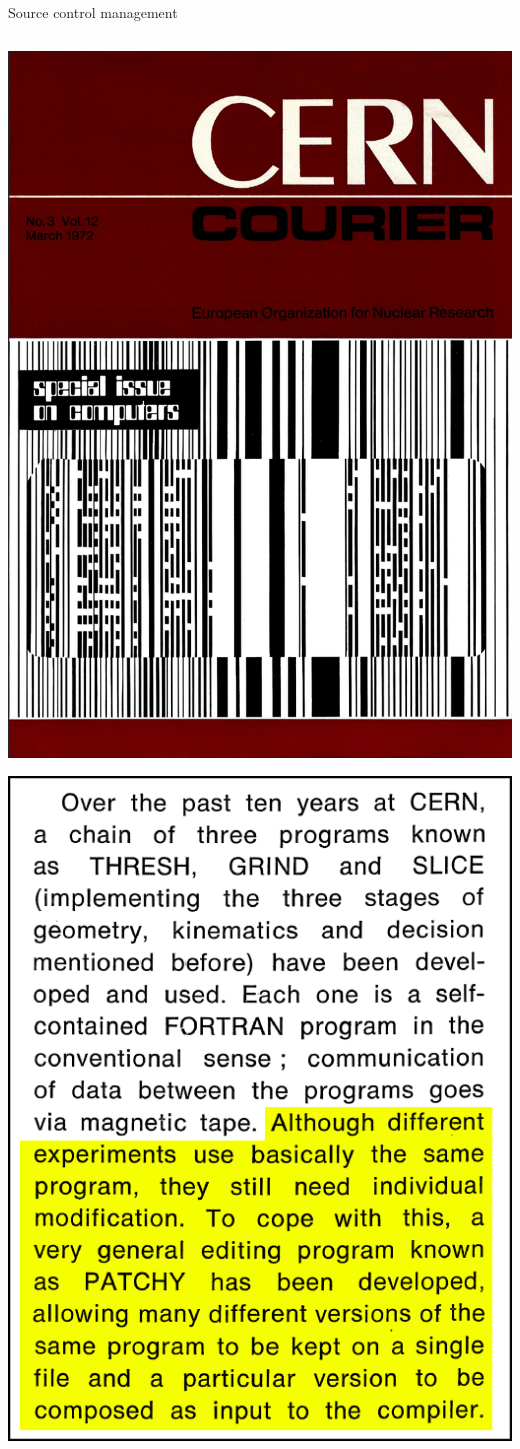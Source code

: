\documentclass[aspectratio=169]{beamer}
\begin{document}
\begin{frame}{Source control management}
\begin{columns}
\begin{center}
\vspace{0.2 cm}
\includegraphics[width=0.55\linewidth]{PLOTS/cern-courier-2.png}

\vspace{-5 cm}
\mbox{\hspace{2 cm}\includegraphics[height=5.5 cm]{PLOTS/patchy-2.png}}
\end{center}
\end{columns}
\end{frame}
\end{document}
